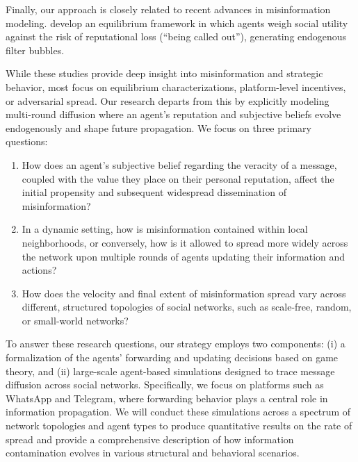 Finally, our approach is closely related to recent advances in misinformation modeling. \citet{acemoglu2024misinformation} develop an equilibrium framework in which agents weigh social utility against the risk of reputational loss (“being called out”), generating endogenous filter bubbles. 

While these studies provide deep insight into misinformation and strategic behavior, most focus on equilibrium characterizations, platform-level incentives, or adversarial spread. Our research departs from this by explicitly modeling multi-round diffusion where an agent’s reputation and subjective beliefs evolve endogenously and shape future propagation. We focus on three primary questions: 


\begin{enumerate}
    \item How does an agent's subjective belief regarding the veracity of a message, coupled with the value they place on their personal reputation, affect the initial propensity and subsequent widespread dissemination of misinformation?
    \item In a dynamic setting, how is misinformation contained within local neighborhoods, or conversely, how is it allowed to spread more widely across the network upon multiple rounds of agents updating their information and actions?
    \item How does the velocity and final extent of misinformation spread vary across different, structured topologies of social networks, such as scale-free, random, or small-world networks?
\end{enumerate}

To answer these research questions, our strategy employs two  components: (i) a formalization of the agents' forwarding and updating decisions based on game theory, and (ii) large-scale agent-based simulations designed to trace message diffusion across social networks. Specifically, we focus on platforms such as WhatsApp and Telegram, where forwarding behavior plays a central role in information propagation. We will conduct these simulations across a spectrum of network topologies and agent types to produce quantitative results on the rate of spread and provide a comprehensive description of how information contamination evolves in various structural and behavioral scenarios.